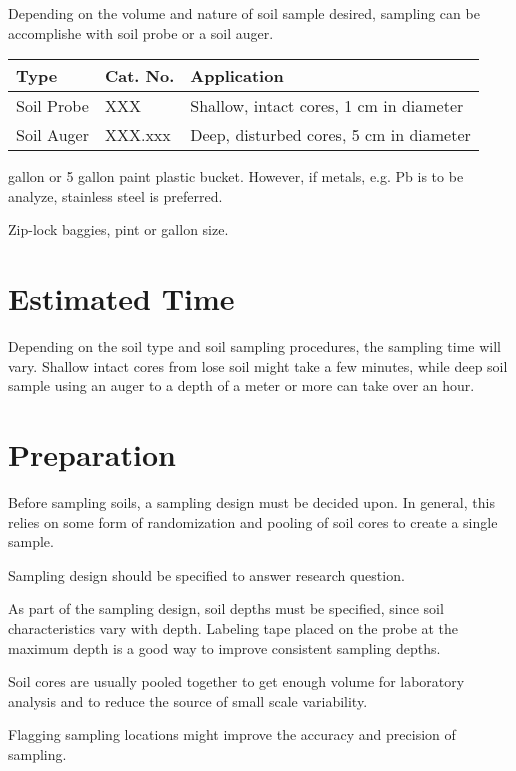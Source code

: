 \documentclass[12pt]{../SOP2}\usepackage[]{graphicx}\usepackage[]{color}
\begin{document}
\NP Depending on the volume and nature of soil sample desired, sampling can be accomplishe with soil probe or a soil auger. 

\begin{table}[h]
\begin{tabular}{lll} \hline
Type      &     Cat. No.    &  Application \\ \hline\hline
Soil Probe  & XXX         & Shallow, intact cores, 1 cm in diameter \\
Soil Auger  & XXX.xxx     & Deep, disturbed cores, 5 cm in diameter \\ \hline

\end{tabular}
\end{table}

 gallon or 5 gallon paint plastic bucket. However, if metals, e.g. Pb is to be analyze, stainless steel is preferred.

\NP Zip-lock baggies, pint or gallon size.

\section{Estimated Time}

\NP Depending on the soil type and soil sampling procedures, the sampling time will vary. Shallow intact cores from lose soil might take a few minutes, while deep soil sample using an auger to a depth of a meter or more can take over an hour.

\section{Preparation}

\NP Before sampling soils, a sampling design must be decided upon. In general, this relies on some form of randomization and pooling of soil cores to create a single sample. 

\NP Sampling design should be specified to answer research question.

\NP As part of the sampling design, soil depths must be specified, since soil characteristics vary with depth. Labeling tape placed on the probe at the maximum depth is a good way to improve consistent sampling depths.

\NP Soil cores are usually pooled together to get enough volume for laboratory analysis and to reduce the source of small scale variability.

\NP Flagging sampling locations might improve the accuracy and precision of sampling.
\end{document}
